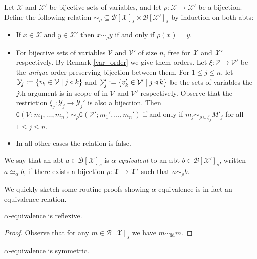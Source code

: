 \begin{defin}
    Let $\mathcal{X}$ and $\mathcal{X}'$ be bijective sets of variables, and let $\rho : \mathcal{X} \to \mathcal{X'}$ be a bijection. Define the following relation $\sim_\rho \subseteq \mathcal{B}[\mathcal{X}]_s \times \mathcal{B}[\mathcal{X}']_s$ by induction on both abts:
    \begin{itemize}
        \item If $x \in \mathcal{X}$ and $y \in \mathcal{X}'$ then $x \sim_\rho y $ if and only if $\rho(x) = y$.
        \item For bijective sets of variables $\mathcal{V}$ and $\mathcal{V}'$ of size $n$, free for $\mathcal{X}$ and $\mathcal{X}'$ respectively. By Remark \ref{var_order} we give them orders. Let $\xi : \mathcal{V} \to \mathcal{V}'$ be the \emph{unique} order-preserving bijection between them. For $1 \le j \le n$, let $\mathcal{Y}_j := \{ v_k \in \mathcal{V} \mid j \triangleleft k\}$ and $\mathcal{Y}_j' := \{ v_k' \in \mathcal{V}' \mid j \triangleleft k \}$ be the sets of variables the $j$th argument is in scope of in $\mathcal{V}$ and $\mathcal{V}'$ respectively. Observe that the restriction $\xi_j : \mathcal{Y}_j \to \mathcal{Y}_j'$ is also a bijection. Then $\mathtt{G}(\mathcal{V}; m_1, \dots, m_n) \sim_\rho \mathtt{G}(\mathcal{V}'; m_1', \dots, m_n')$ if and only if $m_j \sim_{\rho \cup \xi_j} M'_j$ for all $1 \le j \le n$.
        \item In all other cases the relation is false.
    \end{itemize}

    We say that an abt $a \in \mathcal{B}[\mathcal{X}]_s$ is \emph{$\alpha$-equivalent} to an abt $b \in \mathcal{B}[\mathcal{X}']_s$, written $a \simeq_{\alpha} b$, if there exists a bijection $\rho : \mathcal{X} \to \mathcal{X'}$ such that $a \sim_\rho b$.
\end{defin}

We quickly sketch some routine proofs showing $\alpha$-equivalence is in fact an equivalence relation.

\begin{lemma}[Reflexivity]
    $\alpha$-equivalence is reflexive.
\end{lemma}
    
\begin{proof}    
     Observe that for any $m \in \mathcal{B}[\mathcal{X}]_s$ we have $m \sim_{\mathrm{id}} m$. 
\end{proof}

\begin{lemma}[Symmetry]
    $\alpha$-equivalence is symmetric.
\end{lemma}

